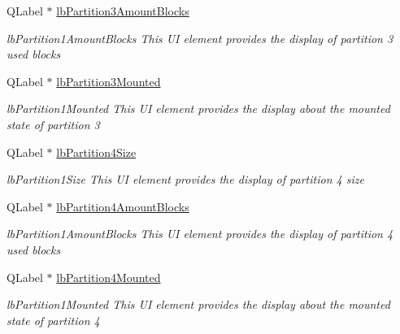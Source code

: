 \begin{DoxyCompactItemize}
\mbox{\label{class_disk_info_ad283ee59c4dcf385fb3daabe0b67f7fd}} 
Q\+Label $\ast$ \mbox{\hyperlink{class_disk_info_ad283ee59c4dcf385fb3daabe0b67f7fd}{lb\+Partition3\+Amount\+Blocks}}
\begin{DoxyCompactList}\small\item\em lb\+Partition1\+Amount\+Blocks This UI element provides the display of partition 3 used blocks \end{DoxyCompactList}\item 
\mbox{\label{class_disk_info_a3855ad2d54ae9ecbd326508402b501e2}} 
Q\+Label $\ast$ \mbox{\hyperlink{class_disk_info_a3855ad2d54ae9ecbd326508402b501e2}{lb\+Partition3\+Mounted}}
\begin{DoxyCompactList}\small\item\em lb\+Partition1\+Mounted This UI element provides the display about the mounted state of partition 3 \end{DoxyCompactList}\item 
\mbox{\label{class_disk_info_a9e45531be5167f66db45a186200394f3}} 
Q\+Label $\ast$ \mbox{\hyperlink{class_disk_info_a9e45531be5167f66db45a186200394f3}{lb\+Partition4\+Size}}
\begin{DoxyCompactList}\small\item\em lb\+Partition1\+Size This UI element provides the display of partition 4 size \end{DoxyCompactList}\item 
\mbox{\label{class_disk_info_ab6731655c1ec906492d6f7385aa3494a}} 
Q\+Label $\ast$ \mbox{\hyperlink{class_disk_info_ab6731655c1ec906492d6f7385aa3494a}{lb\+Partition4\+Amount\+Blocks}}
\begin{DoxyCompactList}\small\item\em lb\+Partition1\+Amount\+Blocks This UI element provides the display of partition 4 used blocks \end{DoxyCompactList}\item 
\mbox{\label{class_disk_info_a176b3b7e4909d40d9f9a9bbc0e3bd132}} 
Q\+Label $\ast$ \mbox{\hyperlink{class_disk_info_a176b3b7e4909d40d9f9a9bbc0e3bd132}{lb\+Partition4\+Mounted}}
\begin{DoxyCompactList}\small\item\em lb\+Partition1\+Mounted This UI element provides the display about the mounted state of partition 4 \end{DoxyCompactList}\item 

\end{DoxyCompactItemize}
